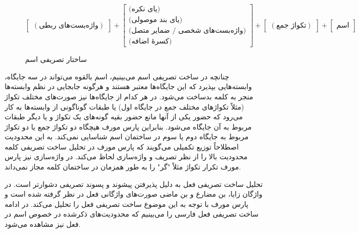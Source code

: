 \documentclass[12pt,onecolumn,a4paper]{article}
\begin{document}
    \begin{figure}[hp]
        \[
            \begin{bmatrix}
                (\textrm{واژه‌بست‌های ربطی})
            \end{bmatrix}
            +
            \begin{bmatrix}
                \textrm{(یای نکره)} \\
                \textrm{(یای بند موصولی)} \\
                \textrm{(واژه‌بست‌های شخصی / ضمایر متصل)} \\
                \textrm{(کسرهٔ اضافه)}
            \end{bmatrix}
            +
            \begin{bmatrix}
                (\textrm{تکواژ جمع})
            \end{bmatrix}
            +
            \begin{bmatrix}
                \textrm{اسم}
            \end{bmatrix}
        \]
        \caption{ساختار تصریفی اسم {\mfo\citep{Eslami88}}}
    \end{figure}

    \par\noindent
    چنانچه در ساخت تصریفی اسم می‌بینیم، اسم بالقوه می‌تواند در سه جایگاه، وابسته‌هایی بپذیرد که این جایگاه‌ها معتبر هستند و هرگونه جابجایی در نظم وابسته‌ها منجر به کلمه بدساخت می‌شود. در هر کدام از جایگاه‌ها نیز صورت‌های مختلف تکواژ (مثلاً تکواژهای مختلف جمع در جایگاه اول) یا طبقات گوناگونی از وابسته‌ها به کار می‌رود که حضور یکی از آنها مانع حضور بقیه گونه‌های یک تکواژ و یا دیگر طبقات مربوط به آن جایگاه می‌شود. بنابراین پارس مورف هیچگاه دو تکواژ جمع یا دو تکواژ مربوط به جایگاه دوم یا سوم در ساختمان اسم شناسایی نمی‌کند. به این محدودیت اصطلاحاً توزیع تکمیلی  می‌گویند که پارس مورف در تحلیل ساخت تصریفی کلمه محدودیت بالا را از نظر تصریف و واژه‌سازی لحاظ می‌کند. در واژه‌سازی نیز پارس مورف تکرار تکواژ مثلاً "گر" را به طور همزمان در ساختمان کلمه مجاز نمی‌داند.

    \par\noindent
    تحلیل ساخت تصریفی فعل به دلیل پذیرفتن پیشوند و پسوند تصریفی دشوارتر است. در واژگان زایا، بن مضارع و بن ماضی صورت‌های واژگانی فعل در نظر گرفته شده است و پارس مورف با توجه به این موضوع ساخت تصریفی فعل را تحلیل می‌کند. در ادامه ساخت تصریفی فعل فارسی را می‌بینیم که محدودیت‌های ذکرشده در خصوص اسم در فعل نیز مشاهده می‌شود.
\end{document}
